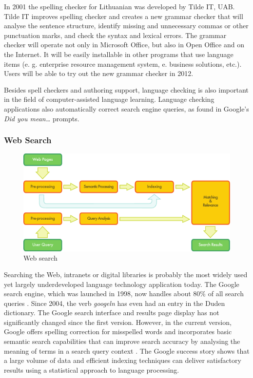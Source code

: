 \begin{multicols}{2}
In 2001 the spelling checker for Lithuanian was developed by Tilde IT, UAB. Tilde IT improves spelling checker and creates a new grammar checker that will analyse the sentence structure, identify missing and unnecessary commas or other punctuation marks, and check the syntax and lexical errors. The grammar checker will operate not only in Microsoft Office, but also in Open Office and on the Internet. It will be easily installable in other programs that use language items (e. g. enterprise resource management system, e. business solutions, etc.). Users will be able to try out the new grammar checker in 2012.

Besides spell checkers and authoring support, language checking is also important in the field of computer-assisted language learning. Language checking applications also automatically correct search engine queries, as found in Google's \textit{Did you mean…} prompts.

\subsubsection{Web Search}

\begin{figure}[htb]
  \center
  \includegraphics[width=\textwidth]{../_media/english/web_search_architecture}
  \caption{Web search}
  \label{fig:websearcharch_en}
 \end{figure}

Searching the Web, intranets or digital libraries is probably the most widely used yet largely underdeveloped language technology application today. The Google search engine, which was launched in 1998, now handles about 80\% of all search queries \cite{spi1}. Since 2004, the verb \textit{googeln} has even had an entry in the Duden dictionary. The Google search interface and results page display has not significantly changed since the first version. However, in the current version, Google offers spelling correction for misspelled words and incorporates basic semantic search capabilities that can improve search accuracy by analysing the meaning of terms in a search query context \cite{pc1}. The Google success story shows that a large volume of data and efficient indexing techniques can deliver satisfactory results using a statistical approach to language processing. 


\end{multicols}
